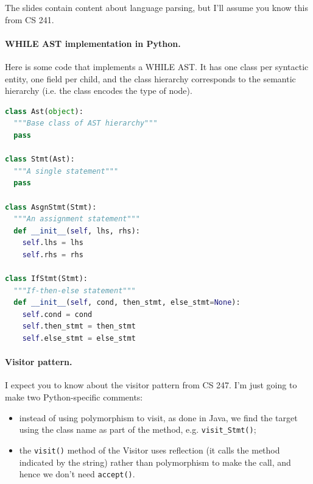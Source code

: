 \documentclass[11pt]{article}
\begin{document}
The slides contain content about language parsing, but I'll assume you know this from CS 241.

\paragraph{WHILE AST implementation in Python.} Here is some code that implements a WHILE AST. It has
one class per syntactic entity, one field per child, and the class hierarchy corresponds to the
semantic hierarchy (i.e. the class encodes the type of node).

\begin{lstlisting}[language=Python]
class Ast(object):
  """Base class of AST hierarchy"""
  pass

class Stmt(Ast):
  """A single statement"""
  pass

class AsgnStmt(Stmt):
  """An assignment statement"""
  def __init__(self, lhs, rhs):
    self.lhs = lhs
    self.rhs = rhs

class IfStmt(Stmt):
  """If-then-else statement"""
  def __init__(self, cond, then_stmt, else_stmt=None):
    self.cond = cond
    self.then_stmt = then_stmt
    self.else_stmt = else_stmt
\end{lstlisting}

\paragraph{Visitor pattern.} I expect you to know about the visitor pattern from CS 247.
I'm just going to make two Python-specific comments:
\begin{itemize}[noitemsep]
\item instead of using polymorphism to visit, as done in Java, we find the target using the class name as part of the method, e.g. \texttt{visit\_Stmt()};
\item the \texttt{visit()} method of the Visitor uses reflection (it calls the method indicated by the string) rather than polymorphism to make the call, and hence we don't need \texttt{accept()}.
\end{itemize}
\end{document}
